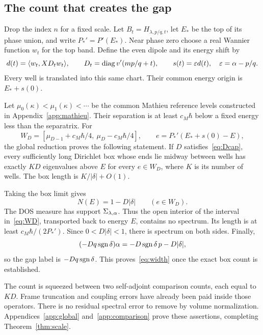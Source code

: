 \subsection{The count that creates the gap}
Drop the index $n$ for a fixed scale. Let $B_t=H_{\lambda,p/q,t}$, let $E_*$ be the top of its phase union, and write $P_*'=P'(E_*)$. Near phase zero choose a real Wannier function $w_t$ for the top band. Define the even dipole and its energy shift by
\begin{equation}\label{eq:dipole}
 d(t)=\langle w_t,XD_tw_t\rangle,\qquad
 D_t=\operatorname{diag}v'(mp/q+t),\qquad s(t)=\varepsilon d(t),
 \quad \varepsilon=\alpha-p/q.
\end{equation}
Every well is translated into this same chart. Their common energy origin is $E_*+s(0)$.

Let $\mu_0(\kappa)<\mu_1(\kappa)<\cdots$ be the common Mathieu reference levels constructed in Appendix~\ref{app:mathieu}. Their separation is at least $c_M\hbar$ below a fixed energy less than the separatrix. For
\begin{equation}\label{eq:WD}
 W_D=[\mu_{D-1}+c_M\hbar/4,\ \mu_D-c_M\hbar/4],
 \qquad e=P_*'(E_*+s(0)-E),
\end{equation}
the global reduction proves the following statement. If $D$ satisfies~\eqref{eq:Dcap}, every sufficiently long Dirichlet box whose ends lie midway between wells has exactly $KD$ eigenvalues above $E$ for every $e\in W_D$, where $K$ is its number of wells. The box length is $K/|\delta|+O(1)$.

Taking the box limit gives
\begin{equation}\label{eq:IDSidentity}
 N(E)=1-D|\delta|\qquad(e\in W_D).
\end{equation}
The DOS measure has support $\Sigma_{\lambda,\alpha}$. Thus the open interior of the interval in~\eqref{eq:WD}, transported back to energy $E$, contains no spectrum. Its length is at least $c_M\hbar/(2P_*')$. Since $0<D|\delta|<1$, there is spectrum on both sides. Finally,
\[
 (-Dq\operatorname{sgn}\delta)\alpha
 =-D\operatorname{sgn}\delta\,p-D|\delta|,
\]
so the gap label is $-Dq\operatorname{sgn}\delta$. This proves~\eqref{eq:width} once the exact box count is established.

The count is squeezed between two self-adjoint comparison counts, each equal to $KD$. Frame truncation and coupling errors have already been paid inside those operators. There is no residual spectral error to remove by volume normalization. Appendices~\ref{app:global} and~\ref{app:comparison} prove these assertions, completing Theorem~\ref{thm:scale}.

\label{end:consequences}

